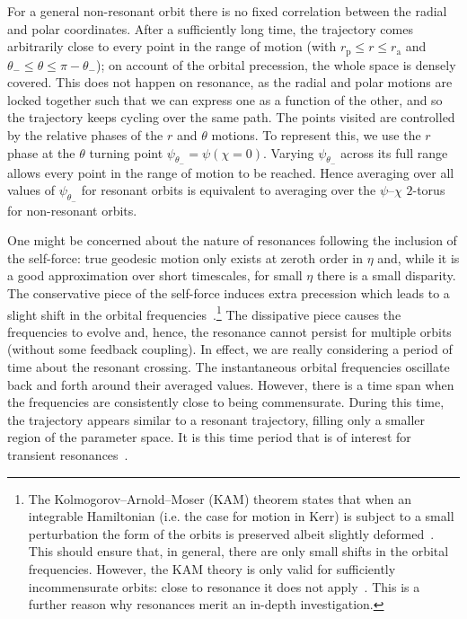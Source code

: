 \documentclass[aps,prd,amsfonts,amssymb,amsmath,nofootinbib,showpacs,superscriptaddress,twocolumn,floatfix]{revtex4-1}
\newcommand{\sub}[1]{\ensuremath{_\mathrm{#1}}}
\begin{document}
For a general non-resonant orbit there is no fixed correlation between the radial and polar coordinates. After a sufficiently long time, the trajectory comes arbitrarily close to every point in the range of motion (with $r\sub{p} \leq r \leq r\sub{a}$ and $\theta_- \leq \theta \leq \pi - \theta_-$); on account of the orbital precession, the whole space is densely covered. This does not happen on resonance, as the radial and polar motions are locked together such that we can express one as a function of the other, and so the trajectory keeps cycling over the same path. The points visited are controlled by the relative phases of the $r$ and $\theta$ motions. To represent this, we use the $r$ phase at the $\theta$ turning point $\psi_{\theta_-} = \psi(\chi = 0)$. Varying $\psi_{\theta_-}$ across its full range allows every point in the range of motion to be reached. Hence averaging over all values of $\psi_{\theta_-}$ for resonant orbits is equivalent to averaging over the $\psi$--$\chi$ $2$-torus for non-resonant orbits.

One might be concerned about the nature of resonances following the inclusion of the self-force: true geodesic motion only exists at zeroth order in $\eta$ and, while it is a good approximation over short timescales, for small $\eta$ there is a small disparity. The conservative piece of the self-force induces extra precession which leads to a slight shift in the orbital frequencies~\cite{Warburton2012}.\footnote{The Kolmogorov--Arnold--Moser (KAM) theorem states that when an integrable Hamiltonian (i.e. the case for motion in Kerr) is subject to a small perturbation the form of the orbits is preserved albeit slightly deformed~\cite{Arnold1963,Moser1973}. %
This should ensure that, in general, there are only small shifts in the orbital frequencies. However, the KAM theory is only valid for sufficiently incommensurate orbits: close to resonance it does not apply~\cite{Moser1973}. %
This is a further reason why resonances merit an in-depth investigation.}
The dissipative piece causes the frequencies to evolve and, hence, the resonance cannot persist for multiple orbits (without some feedback coupling). In effect, we are really considering a period of time about the resonant crossing. The instantaneous orbital frequencies oscillate back and forth around their averaged values. However, there is a time span when the frequencies are consistently close to being commensurate. During this time, the trajectory appears similar to a resonant trajectory, filling only a smaller region of the parameter space. It is this time period that is of interest for transient resonances~\cite{Bosley1992}.
\end{document}
